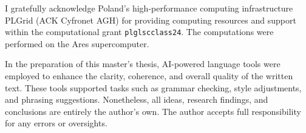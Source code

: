 


I gratefully acknowledge Poland's high-performance computing infrastructure PLGrid (ACK Cyfronet AGH) for providing computing resources and support within the computational grant \texttt{plglscclass24}.
The computations were performed on the Ares supercomputer.

\vspace{4cm} %


\noindent In the preparation of this master’s thesis, AI-powered language tools were employed to enhance the clarity, coherence, and overall quality of the written text. These tools supported tasks such as grammar checking, style adjustments, and phrasing suggestions. Nonetheless, all ideas, research findings, and conclusions are entirely the author’s own. The author accepts full responsibility for any errors or oversights.

\MediaOptionLogicBlank